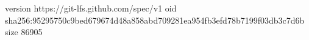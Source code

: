 version https://git-lfs.github.com/spec/v1
oid sha256:95295750c9bed679674d48a858abd709281ea954fb3efd78b7199f03db3c7d6b
size 86905

